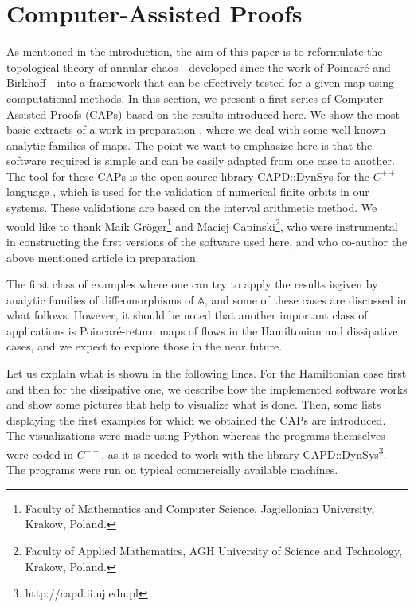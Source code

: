 \documentclass[12pt,a4paper]{amsart}
\theoremstyle{definition}
\theoremstyle{remark}
\newcommand{\A}{\mathbb{A}}
\begin{document}
%
%
\section{Computer-Assisted Proofs}\label{s.numerics}

As mentioned in the introduction, the aim of this paper is to reformulate the topological theory of annular chaos---developed since the work of Poincar\'e and Birkhoff---into a framework that can be effectively tested for a given map using computational methods. In this section, we present a first series of Computer Assisted Proofs (CAPs) based on the results introduced here.
We show the most basic extracts of a work in preparation \cite{theoappandnumer}, where we deal
with some well-known analytic families of maps.  The point we want to emphasize here is that the software required is simple and can be easily adapted
from one case to another. The tool for these CAPs is the open source library CAPD::DynSys for the $C^{++}$ language \cite{compassproof}, which is used for the validation of numerical finite orbits in our systems. These validations
are based on the interval arithmetic method. We would like to thank 
 Maik Gr\"oger\footnote{Faculty of Mathematics and Computer Science,
Jagiellonian University, Krakow, Poland. } and Maciej Capinski\footnote{Faculty of Applied Mathematics, AGH University of Science and Technology, Krakow, Poland.}, who were instrumental in constructing the first versions of the software used here, and who co-author the above mentioned article in preparation.

\smallskip

The first class of examples where one can try to apply the results isgiven by analytic families of diffeomorphisms of $\A$, 
and some of these cases are discussed in what follows. However, it should be noted that another important class of applications is Poincar\'{e}-return maps of flows in the Hamiltonian and dissipative cases, and we expect to explore those in the near future.

\medskip

Let us explain what is shown in the following lines. For the Hamiltonian case first and then for the dissipative one, we describe how the implemented software works and show some pictures that help to visualize what is done. Then, some lists
displaying the first examples for which we obtained the CAPs are introduced. The visualizations were
made using Python whereas the programs themselves were coded in $C^{++}$, as it is needed to work
 with the library CAPD::DynSys\footnote{http://capd.ii.uj.edu.pl}. The programs were run on typical commercially available machines. %
 
\end{document}
